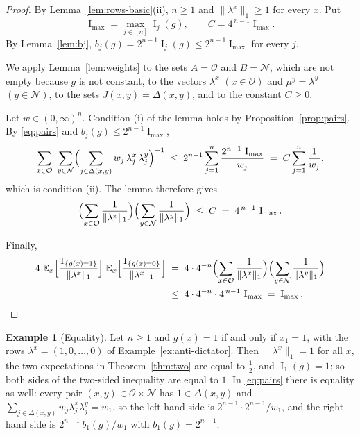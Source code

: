 \documentclass[11pt,reqno]{amsart}
\theoremstyle{definition}
\newtheorem{example}[theorem]{Example}
\theoremstyle{remark}
\numberwithin{equation}{section}
\theoremstyle{named}
\theoremstyle{plain}
\newcommand{\E}{\mathbb{E}}
\newcommand{\I}{\operatorname{I}}
\newcommand{\cO}{\mathcal{O}}
\newcommand{\cN}{\mathcal{N}}
\newcommand{\norm}[1]{\lVert #1\rVert_1}
\begin{document}
\begin{proof}
By Lemma~\ref{lem:rows-basic}(ii), $n\ge1$ and $\norm{\lambda^{x}}\ge1$ for every $x$. Put
\[
   \I_{\max}=\max_{j\in[n]}\I_j(g),\qquad C=4^{\,n-1}\I_{\max} .
\]
By Lemma~\ref{lem:bj}, $b_j(g)=2^{n-1}\I_j(g)\le2^{n-1}\I_{\max}$ for every $j$.

We apply Lemma~\ref{lem:weights} to the sets $A=\cO$ and $B=\cN$, which are not empty because $g$
is not constant, to the vectors $\lambda^{x}$ $(x\in\cO)$ and $\mu^{y}=\lambda^{y}$ $(y\in\cN)$, to
the sets $J(x,y)=\Delta(x,y)$, and to the constant $C\ge0$.

Let $w\in(0,\infty)^{n}$. Condition (i) of
the lemma holds by Proposition~\ref{prop:pairs}. By \eqref{eq:pairs} and
$b_j(g)\le2^{n-1}\I_{\max}$,
\[
   \sum_{x\in\cO}\ \sum_{y\in\cN}\Bigl(\sum_{j\in\Delta(x,y)}w_j\,\lambda^{x}_j\,\lambda^{y}_j\Bigr)^{-1}
   \;\le\;2^{n-1}\sum_{j=1}^{n}\frac{2^{n-1}\,\I_{\max}}{w_j}\;=\;C\sum_{j=1}^{n}\frac1{w_j},
\]
which is condition (ii). The lemma therefore gives
\[
   \Bigl(\sum_{x\in\cO}\frac1{\norm{\lambda^{x}}}\Bigr)
   \Bigl(\sum_{y\in\cN}\frac1{\norm{\lambda^{y}}}\Bigr)\;\le\;C\;=\;4^{\,n-1}\,\I_{\max}.
\]

Finally,
\begin{align*}
   4\;\E_x\Bigl[\frac{1_{\{g(x)=1\}}}{\norm{\lambda^{x}}}\Bigr]\;
      \E_x\Bigl[\frac{1_{\{g(x)=0\}}}{\norm{\lambda^{x}}}\Bigr]
   &\;=\;4\cdot4^{-n}\Bigl(\sum_{x\in\cO}\frac1{\norm{\lambda^{x}}}\Bigr)
     \Bigl(\sum_{y\in\cN}\frac1{\norm{\lambda^{y}}}\Bigr)\\
   &\;\le\;4\cdot4^{-n}\cdot4^{\,n-1}\,\I_{\max}\;=\;\I_{\max}. \qedhere
\end{align*}
\end{proof}

\begin{example}[Equality]\label{ex:dictator}
Let $n\ge1$ and $g(x)=1$ if and only if $x_1=1$, with the rows $\lambda^{x}=(1,0,\dots,0)$
of Example~\ref{ex:anti-dictator}. Then $\norm{\lambda^{x}}=1$ for all $x$, the two expectations in
Theorem~\ref{thm:two} are equal to $\frac12$, and $\I_1(g)=1$; so both sides of the two-sided
inequality are equal to $1$. In \eqref{eq:pairs} there is equality as well: every pair
$(x,y)\in\cO\times\cN$ has $1\in\Delta(x,y)$ and
$\sum_{j\in\Delta(x,y)}w_j\lambda^{x}_j\lambda^{y}_j=w_1$, so the left-hand side is
$2^{n-1}\cdot2^{n-1}/w_1$, and the right-hand side is $2^{n-1}\,b_1(g)/w_1$ with $b_1(g)=2^{n-1}$.
\end{example}
\end{document}
